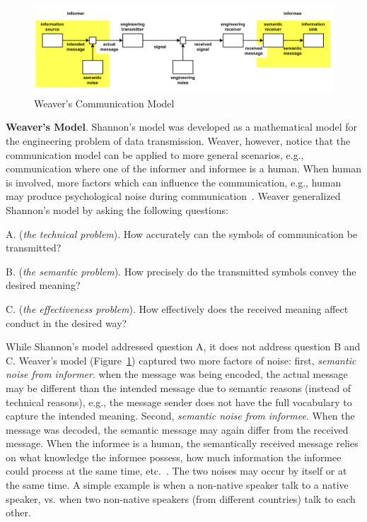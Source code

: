 \begin{figure}[h]
\centering
\includegraphics[width=.9\linewidth]{figure/chapter1/weaver}
\caption{Weaver's Communication Model~\cite{shannon1951mathematical}\label{fig:ch1:weaver}}
\end{figure}

\textbf{Weaver's Model}. Shannon's model was developed as a mathematical model for the engineering problem of data transmission. Weaver, however, notice that the communication model can be applied to more general scenarios, e.g., communication where one of the informer and informee is a human. When human is involved, more factors which can influence the communication, e.g., human may produce psychological noise during communication~\cite{miller1967psychology}. Weaver generalized Shannon's model by asking the following questions:

A. (\textit{the technical problem}). How accurately can the symbols of communication be transmitted?

B. (\textit{the semantic problem}). How precisely do the transmitted symbols convey the desired meaning?

C. (\textit{the effectiveness problem}). How effectively does the received meaning affect conduct in the desired way?

While Shannon's model addressed question A, it does not address question B and C. Weaver's model (Figure~\ref{fig:ch1:weaver}) captured two more factors of noise: first, \textit{semantic noise from informer}. when the message was being encoded, the actual message may be different than the intended message due to semantic reasons (instead of technical reasons), e.g., the message sender does not have the full vocabulary to capture the intended meaning. Second, \textit{semantic noise from informee}. When the message was decoded, the semantic message may again differ from the received message. When the informee is a human, the semantically received message relies on what knowledge the informee possess, how much information the informee could process at the same time, etc.~\cite{weavernote}. The two noises may occur by itself or at the same time. A simple example is when a non-native speaker talk to a native speaker, vs. when two non-native speakers (from different countries) talk to each other. 

